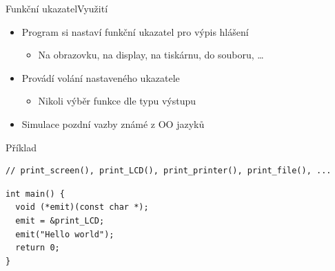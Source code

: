 \begin{frame}[fragile]{Funkční ukazatel}{Využití}

  \begin{itemize}
    \item Program si nastaví funkční ukazatel pro výpis hlášení
    \begin{itemize}
      \item Na obrazovku, na display, na tiskárnu, do souboru, \dots
    \end{itemize}

    \pause

    \item Provádí volání nastaveného ukazatele
    \begin{itemize}
      \item Nikoli výběr funkce dle typu výstupu
    \end{itemize}

    \pause

    \item Simulace pozdní vazby známé z OO jazyků
  \end{itemize}


\begin{block}{Příklad}
\begin{lstlisting}
// print_screen(), print_LCD(), print_printer(), print_file(), ...
\end{lstlisting}
\begin{lstlisting}
int main() {
  void (*emit)(const char *);
  emit = &print_LCD;
  emit("Hello world");
  return 0;
}
\end{lstlisting}
\end{block}

\end{frame}

